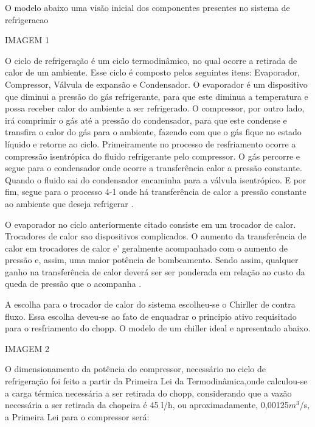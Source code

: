             O modelo abaixo uma visão inicial dos componentes presentes no sistema de
            refrigeracao

            IMAGEM 1

            O ciclo de refrigeração é um ciclo termodinâmico, no qual ocorre a retirada de calor de
            um ambiente. Esse ciclo é composto pelos seguintes itens: Evaporador, Compressor, Válvula
            de expansão e Condensador. O evaporador é um dispositivo que diminui a pressão do gás
            refrigerante, para que este diminua a temperatura e possa receber calor do ambiente a ser
            refrigerado. O compressor, por outro lado, irá comprimir o gás até a pressão do condensador,
            para que este condense e transfira o calor do gás para o ambiente, fazendo com que o gás
            fique no estado líquido e retorne ao ciclo. Primeiramente no processo de resfriamento ocorre a
            compressão isentrópica do fluido refrigerante pelo compressor. O gás percorre e segue para o
            condensador onde ocorre a transferência calor a pressão constante. Quando o fluido sai do
            condensador encaminha para a válvula isentrópico. E por fim, segue para o processo 4-1 onde
            há transferência de calor a pressão constante ao ambiente que deseja refrigerar \cite{boles}.

            O evaporador no ciclo anteriormente citado consiste em um trocador de calor.
            Trocadores de calor sao dispositivos complicados. O aumento da transferência de calor em
            trocadores de calor e’ geralmente acompanhado com o aumento de pressão e, assim, uma
            maior potência de bombeamento. Sendo assim, qualquer ganho na transferência de calor
            deverá ser ser ponderada em relação ao custo da queda de pressão que o acompanha \cite{boles}.

            A escolha para o trocador de calor do sistema escolheu-se o Chirller de contra fluxo.
            Essa escolha deveu-se ao fato de enquadrar o principio ativo requisitado para o resfriamento
            do chopp. O modelo de um chiller ideal e apresentado abaixo.

            IMAGEM 2

            O dimensionamento da potência do compressor, necessário no ciclo de
            refrigeração foi feito a partir da Primeira Lei da Termodinâmica,onde calculou-se a
            carga térmica necessária a ser retirada do chopp, considerando que a vazão
            necessária a ser retirada da chopeira é 45 l/h, ou aproximadamente, 0,00125$m^3$/s, a
            Primeira Lei para o compressor será:

